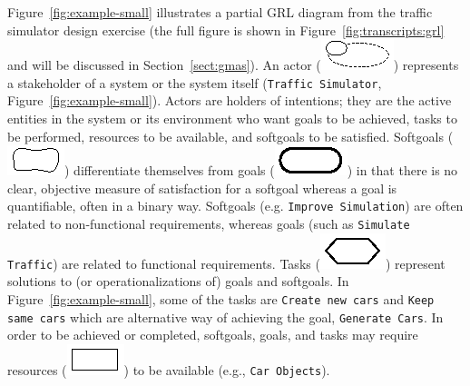 Figure~\ref{fig:example-small} illustrates a partial GRL diagram from the traffic simulator design exercise (the full figure is shown in Figure~\ref{fig:transcripts:grl} and will be discussed in Section~\ref{sect:gmas}). An actor (\includegraphics[scale=1]{img/actor}) represents a stakeholder of a system or the system itself (\texttt{Traffic Simulator}, Figure~\ref{fig:example-small}). Actors are holders of intentions; they are the active entities in the system or its environment who want goals to be achieved, tasks to be performed, resources to be available, and softgoals to be satisfied. Softgoals (\includegraphics[scale=1]{img/softgoal}) differentiate themselves from goals (\includegraphics[scale=1]{img/goal}) in that there is no clear, objective measure of satisfaction for a softgoal whereas a goal is quantifiable, often in a binary way. Softgoals (e.g. \texttt{Improve Simulation}) are often related to non-functional requirements, whereas goals (such as  \texttt{Simulate Traffic}) are related to functional requirements. Tasks (\includegraphics[scale=1]{img/task}) represent solutions to (or operationalizations of) goals and softgoals. In Figure~\ref{fig:example-small}, some of the tasks are  \texttt{Create new cars} and \texttt{Keep same cars} which are alternative way of achieving the goal, \texttt{Generate Cars}. In order to be achieved or completed, softgoals, goals, and tasks may require resources (\includegraphics[scale=1]{img/resource}) to be available (e.g., \texttt{Car Objects}). 

